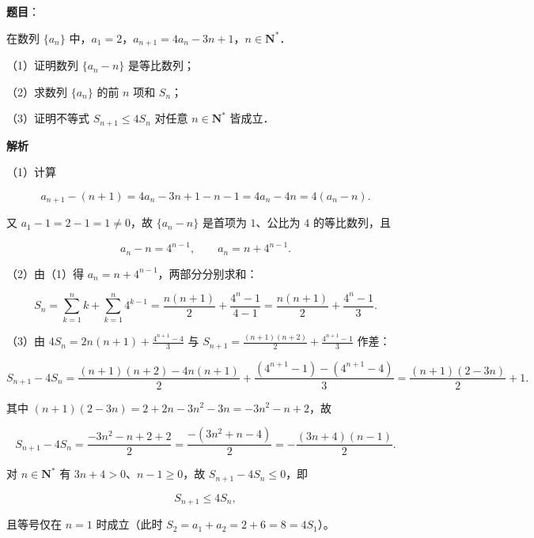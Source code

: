 \begin{answer}

\textbf{题目}：

在数列 $\{a_n\}$ 中，$a_1=2$，$a_{n+1}=4a_n-3n+1$，$n\in\mathbf N^*$．

（1）证明数列 $\{a_n-n\}$ 是等比数列；

（2）求数列 $\{a_n\}$ 的前 $n$ 项和 $S_n$；

（3）证明不等式 $S_{n+1}\leqslant 4S_n$ 对任意 $n\in\mathbf N^*$ 皆成立．

\textbf{解析}

（1）计算

\nopagebreak[4]
\[a_{n+1}-(n+1)=4a_n-3n+1-n-1=4a_n-4n=4\left(a_n-n\right).\]

又 $a_1-1=2-1=1\ne0$，故 $\{a_n-n\}$ 是首项为 $1$、公比为 $4$ 的等比数列，且

\nopagebreak[4]
\[a_n-n=4^{n-1},\qquad a_n=n+4^{n-1}.\]

（2）由（1）得 $a_n=n+4^{n-1}$，两部分分别求和：

\nopagebreak[4]
\[S_n=\sum_{k=1}^{n}k+\sum_{k=1}^{n}4^{k-1}=\frac{n(n+1)}2+\frac{4^n-1}{4-1}=\frac{n(n+1)}2+\frac{4^n-1}3 .\]

（3）由 $4S_n=2n(n+1)+\frac{4^{n+1}-4}3$ 与 $S_{n+1}=\frac{(n+1)(n+2)}2+\frac{4^{n+1}-1}3$ 作差：

\nopagebreak[4]
\[S_{n+1}-4S_n=\frac{(n+1)(n+2)-4n(n+1)}2+\frac{\left(4^{n+1}-1\right)-\left(4^{n+1}-4\right)}3=\frac{(n+1)(2-3n)}2+1 .\]

其中 $(n+1)(2-3n)=2+2n-3n^2-3n=-3n^2-n+2$，故

\nopagebreak[4]
\[S_{n+1}-4S_n=\frac{-3n^2-n+2+2}2=\frac{-\left(3n^2+n-4\right)}2=-\frac{(3n+4)(n-1)}2 .\]

对 $n\in\mathbf N^*$ 有 $3n+4>0$、$n-1\geqslant0$，故 $S_{n+1}-4S_n\leqslant0$，即

\nopagebreak[4]
\[S_{n+1}\leqslant4S_n ,\]

且等号仅在 $n=1$ 时成立（此时 $S_2=a_1+a_2=2+6=8=4S_1$）。


\end{answer}
